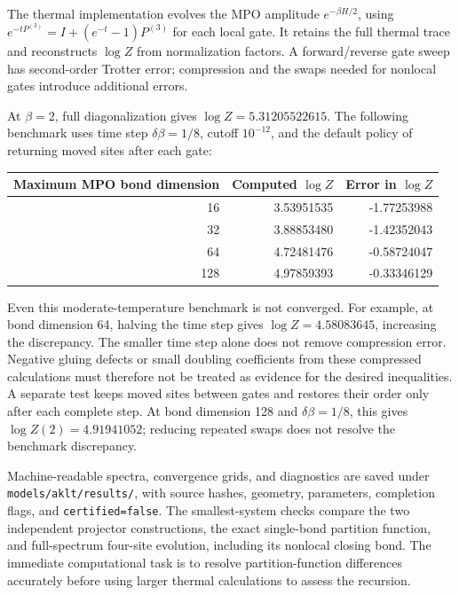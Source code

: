 \documentclass[11pt]{article}
\begin{document}
The thermal implementation evolves the MPO amplitude
\(e^{-\beta H/2}\), using
\(e^{-tP^{(3)}}=I+(e^{-t}-1)P^{(3)}\) for each local gate.
It retains the full thermal trace and reconstructs \(\log Z\) from
normalization factors. A forward/reverse gate sweep has second-order
Trotter error; compression and the swaps needed for nonlocal gates
introduce additional errors.

At \(\beta=2\), full diagonalization gives
\(\log Z=5.31205522615\). The following benchmark uses time step
\(\delta\beta=1/8\), cutoff \(10^{-12}\), and the default policy
of returning moved sites after each gate:
\begin{center}
	\begin{tabular}{rrr}
		\toprule
		Maximum MPO bond dimension & Computed \(\log Z\) & Error in \(\log Z\) \\
		\midrule
		16                         & 3.53951535          & -1.77253988         \\
		32                         & 3.88853480          & -1.42352043         \\
		64                         & 4.72481476          & -0.58724047         \\
		128                        & 4.97859393          & -0.33346129         \\
		\bottomrule
	\end{tabular}
\end{center}
Even this moderate-temperature benchmark is not converged. For example,
at bond dimension 64, halving the time step gives
\(\log Z=4.58083645\), increasing the discrepancy. The smaller time
step alone does not remove compression error. Negative gluing defects
or small doubling coefficients from these compressed calculations must
therefore not be treated as evidence for the desired inequalities.
A separate test keeps moved sites between gates and restores their
order only after each complete step. At bond dimension 128 and
\(\delta\beta=1/8\), this gives \(\log Z(2)=4.91941052\);
reducing repeated swaps does not resolve the benchmark discrepancy.

Machine-readable spectra, convergence grids, and diagnostics are saved
under \texttt{models/aklt/results/}, with source hashes, geometry, parameters,
completion flags, and \texttt{certified=false}. The smallest-system
checks compare the two independent projector constructions, the exact
single-bond partition function, and full-spectrum four-site evolution,
including its nonlocal closing bond. The immediate computational task
is to resolve partition-function differences accurately before using
larger thermal calculations to assess the recursion.
\end{document}
